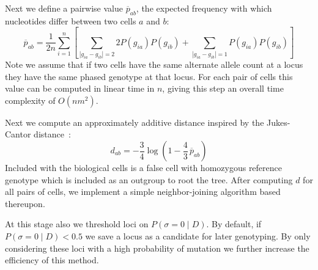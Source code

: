 \documentclass[../../main.tex]{subfiles}
\begin{document}
Next we define a pairwise value $\overline{p}_{ab}$, the expected frequency with which nucleotides differ between two cells $a$ and $b$:
\begin{equation*}
    \overline{p}_{ab} = \frac{1}{2n}\sum_{i=1}^n\left[ \sum_{|g_{ia}-g_{ib}|=2} 2P(g_{ia})P(g_{ib}) + \sum_{|g_{ia}-g_{ib}|=1} P(g_{ia})P(g_{ib})\right]
\end{equation*}
Note we assume that if two cells have the same alternate allele count at a locus they have the same phased genotype at that locus.
For each pair of cells this value can be computed in linear time in $n$, giving this step an overall time complexity of $O(nm^2)$.

Next we compute an approximately additive distance inspired by the Jukes-Cantor distance~\cite{BSA, JC}:
\begin{equation}
    d_{ab} = -\frac{3}{4}\log \left(1-\frac{4}{3}\,\overline{p}_{ab}\right)
\end{equation}
Included with the biological cells is a false cell with homozygous reference genotype which is included as an outgroup to root the tree.
After computing $d$ for all pairs of cells, we implement a simple neighbor-joining algorithm based thereupon.

At this stage also we threshold loci on $P(\sigma = 0 \mid D)$.
By default, if $P(\sigma = 0 \mid D)<0.5$ we save a locus as a candidate for later genotyping.
By only considering these loci with a high probability of mutation we further increase the efficiency of this method.
\end{document}
